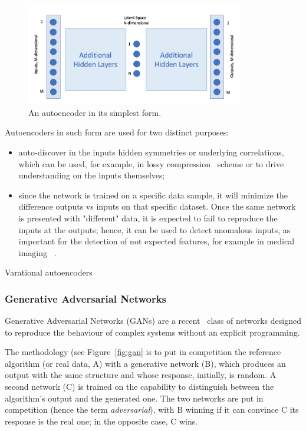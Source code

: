 \begin{figure}[h]
     \centering
     \includegraphics[width=0.85\textwidth]{images/autoencoder.png}
     \caption{An autoencoder in its simplest form.}
     \label{fig:autoencoder}
 \end{figure}
 
 Autoencoders in such form are used for two distinct purposes:
 \begin{itemize}
     \item auto-discover in the inputs hidden symmetries or underlying correlations, which can be used, for example, in lossy compression~\cite{compression} scheme or to drive understanding on the inputs themselves; %
     \item since the network is trained on a specific data sample, it will minimize the difference outputs vs inputs on that specific dataset. Once the same network is presented with "different" data, it is expected to fail to reproduce the inputs at the outputs; hence, it can be used to detect anomalous inputs, as important for the detection of not expected features, for example in medical imaging ~\cite{anomalymed}. %
 \end{itemize}
 
 Varational autoencoders 

\subsubsection{Generative Adversarial Networks}
Generative Adversarial Networks (GANs) are a recent~\cite{goodfellow} class of networks designed to reproduce the behaviour of complex systems without an explicit programming.

The methodology (see Figure~\ref{fig:gan} is to put in competition the reference algorithm (or real data, A) with a generative network (B), which produces an output with the same structure and whose response, initially, is random. A second network (C) is trained on the capability to distinguish between the algorithm's output and the generated one. The two networks are put in competition (hence the term \emph{adversarial}), with B winning if it can convince C its response is the real one; in the opposite case, C wins.
